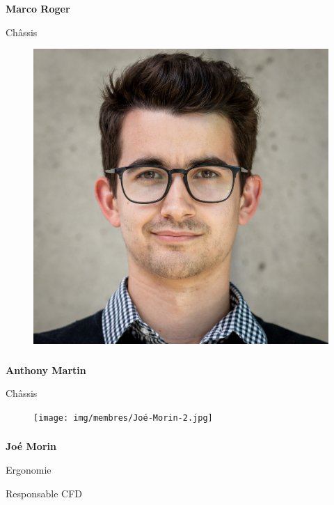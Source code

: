 \documentclass[a0paper,portrait]{baposter}
\begin{document}
\begin{poster}
{\subsubsection*{}
\vspace{2mm}
\textbf{Marco Roger}

Ch\^assis


\begin{figure}
\includegraphics[width=.9\linewidth]{img/membres/Anthony-Martin-2.jpg} 
\end{figure}
\subsubsection*{}
\vspace{-2mm}
\textbf{Anthony Martin}

Ch\^assis



\begin{figure}
\texttt{[image: img/membres/Joé-Morin-2.jpg]} 
\end{figure}
\subsubsection*{}
\vspace{-2mm}
\textbf{Joé Morin}

Ergonomie

Responsable CFD



}
\end{poster}
\end{document}
